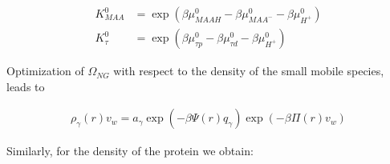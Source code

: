 \documentclass[journal=jacsat,manuscript=suppinfo]{achemso}
\begin{document}
\begin{align}
	K_{MAA}^0&=\exp\left(\beta\mu_{MAAH}^0 - \beta \mu_{MAA^-}^0 - \beta \mu^0_{H^+} \right) \\
	K_{\tau}^0&=\exp\left(\beta\mu_{\tau p}^0 - \beta \mu_{\tau d}^0 - \beta \mu^0_{H^+} \right)
\end{align}











Optimization of $\Omega_{NG}$ with respect to the density of the small mobile species, leads to

\begin{align}
	\rho_\gamma(r)v_w = a_\gamma \exp{\left(-\beta \Psi(r)q_\gamma\right)} \exp{\left(-\beta\Pi(r) v_w\right)}
	\label{eq:si:rho-gamma}
\end{align}


	
	
	Similarly, for the density of the protein we obtain:
	
\end{document}
